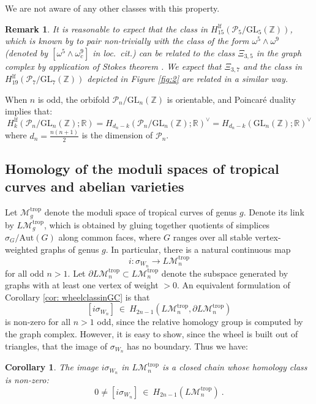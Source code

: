 \documentclass[10pt]{amsart}
\newcommand{\RR}{{\mathbb R}}
\newcommand{\ZZ}{{\mathbb Z}}
\theoremstyle{plain}
\newtheorem{cor}[thm]{Corollary}
\newtheorem{remark}[thm]{Remark}
\newcommand{\LM}{L\mathcal{M}}
\newcommand{\GL}{\mathrm{GL}}
\newcommand{\trop}{\mathrm{trop}}
\newcommand{\To}{\longrightarrow}
\newcommand{\lf}{\mathrm{lf}}
\newcommand{\0}{\color{blue}{\mathsf{0}}}
\begin{document}
We are not aware of any other classes with this property. 
\begin{remark} 
    It is reasonable to expect that the class in $H_{15}^{\lf}(\mathcal{P}_5/\GL_5(\ZZ))$, which is known by \cite{brown2023bordifications} to pair non-trivially with the class of the form   $\omega^5 \wedge \omega^9$  (denoted by $[\omega^5 \wedge \omega_c^9]$ in \emph{loc.\ cit.})   can be related to the class $\Xi_{3,5}$ in the graph complex by  application of Stokes theorem \cite[Theorem 8.5]{BrSigma}. We expect that $\Xi_{3,7}$ and  the class in  $H_{19}^{\lf}(\mathcal{P}_7/\GL_7(\ZZ))$  depicted in Figure \ref{fig:2}  are related in a similar way. 
\end{remark} 
    

When $n$ is odd, the orbifold $\mathcal{P}_n /\GL_n(\ZZ)$ is orientable, and Poincar\'e duality implies that:
\[  H^{\lf}_k(\mathcal{P}_n /\GL_n(\ZZ);\RR) = H_{d_n- k} (\mathcal{P}_n /\GL_n(\ZZ);\RR)^{\vee} = H_{d_n- k} (\GL_n(\ZZ);\RR)^{\vee}    \]
where $d_n = \frac{n(n+1)}{2}$ is the dimension of $\mathcal{P}_n$.

\subsection{Homology of the moduli  spaces  of tropical curves and abelian varieties}
Let $ \mathcal{M}^{\trop}_g$ denote the moduli space of tropical curves of genus $g$. Denote its link by 
$\LM^{\trop}_g$, which is obtained by gluing together quotients of simplices $\sigma_G/\mathrm{Aut}(G)$ along common faces, where $G$ ranges over  all stable vertex-weighted graphs  of genus $g$. In particular, there is a natural continuous map 
\[ i: \sigma_{W_n} \To \LM_{n}^{\trop} \]
for all odd $n>1$. Let $\partial \LM_n^{\trop} \subset \LM_n^{\trop}$ denote the subspace generated by graphs with at least one vertex of weight $>0$.  An equivalent formulation of Corollary \ref{cor: wheelclassinGC}  is that   
\[  [i \sigma_{W_n} ] \ \in \  H_{2n-1} ( \LM_n^{\trop}, \partial  \LM_n^{\trop} ) \]
is non-zero for all $n>1$ odd, since the relative homology group is computed by the graph complex.  However, it is easy to show, since the wheel is built out of triangles,  that the image of $\sigma_{W_n}$ has no boundary. Thus we have:
\begin{cor} The image   $i \sigma_{W_n}$ in $\LM_n^{\trop}$ is a closed chain whose homology class is non-zero: 
\[ 0 \neq  [i \sigma_{W_n}] \ \in \ H_{2n-1}( \LM_n^{\trop})  \ . \]
\end{cor}
\end{document}
